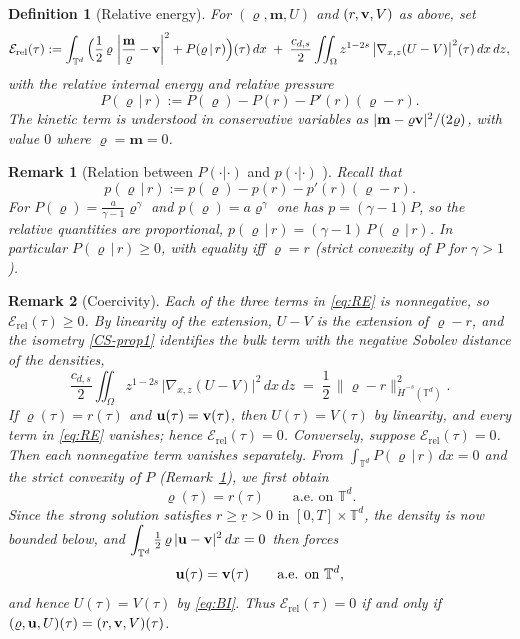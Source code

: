 \documentclass[12pt,a4paper,twoside]{article}
\newcommand{\vr}{\varrho}
\newcommand{\vu}{\vc{u}}
\newcommand{\vv}{\vc{v}}
\newcommand{\vc}[1]{{\bf #1}}
\newcommand{\Erel}{\mathcal{E}_{\mathrm{rel}}}
\newtheorem{df}{Definition}
\newtheorem{rmk}{Remark}
\numberwithin{equation}{section}%
\newcommand{\T}{\mathbb{T}}
\newcommand{\vm}{\vc{m}}
\newcommand{\Gradxz}{\nabla_{x,z}}
\begin{document}
	
	\begin{df}[Relative energy]\label{def:relenergy}
		For $(\vr,\mathbf m, U)$ and $(r,\vv,V)$ as above, set
		\begin{equation}\label{eq:RE}
			\Erel(\tau)
			:= \int_{\mathbb T^d}\Big( \frac12\,\vr\,\left| \frac{\vm}{\vr} - \vv\right|^2 + P(\vr\,|\,r) \Big)(\tau)\,dx
			\;+\; \frac{c_{d,s}}{2}\iint_\Omega z^{1-2s}\,\big|\Gradxz (U-V)\big|^2(\tau)\,dx\,dz,
		\end{equation}
		with the relative internal energy and relative pressure
		\[
		P(\vr\,|\,r) := P(\vr) - P(r) - P'(r)(\vr - r).
		\]
		The kinetic term is understood in conservative variables as $|\mathbf m - \vr\vv|^2/(2\vr)$, with value $0$ where $\vr = \mathbf m = 0$.
	\end{df}
	
\begin{rmk}[Relation between $P(\cdot|\cdot)$ and $p(\cdot| \cdot)$ ]\label{rem:relP} Recall that 
	\[	p(\vr\,|\,r) := p(\vr) - p(r) - p'(r)(\vr - r).\]
	For $P(\vr)=\tfrac{a}{\gamma-1}\vr^\gamma$ and $p(\vr)=a\vr^\gamma$ one has $p=(\gamma-1)P$,
	so the relative quantities are proportional, $p(\vr\,|\,r)=(\gamma-1)\,P(\vr\,|\,r)$. In
	particular $P(\vr\,|\,r)\ge0$, with equality iff $\vr=r$ (strict convexity of $P$ for
	$\gamma>1$).
\end{rmk}

\begin{rmk}[Coercivity]\label{rem:coercivity}
	Each of the three terms in \eqref{eq:RE} is nonnegative, so $\Erel(\tau)\ge0$. By linearity
	of the extension, $U-V$ is the extension of $\vr-r$, and the isometry \eqref{CS-prop1}
	identifies the bulk term with the negative Sobolev distance of the densities,
	\begin{equation}\label{eq:BI}
		\frac{c_{d,s}}{2}\displaystyle\iint_{\Omega} z^{1-2s}\,\big|\Gradxz(U-V)\big|^2\,dx\,dz
		\;=\; \frac12\,\|\vr-r\|_{\dot H^{-s}(\mathbb T^d)}^2 .
	\end{equation}
	If $\vr(\tau)=r(\tau)$ and $\vu(\tau)=\vv(\tau)$, then $U(\tau)=V(\tau)$ by
	linearity, and every term in \eqref{eq:RE} vanishes; hence $\Erel(\tau)=0$.
	Conversely, suppose $\Erel(\tau)=0$. Then each nonnegative term vanishes separately. From
	$\displaystyle\int_{\mathbb T^d} P(\vr\,|\,r)\,dx=0$ and the strict convexity of $P$
	(Remark~\ref{rem:relP}), we first obtain
	\[
	\vr(\tau)=r(\tau)\qquad\text{a.e. on }\mathbb T^d .
	\]
	Since the strong solution satisfies $r \geq \underline{r}>0 \text{ in } [0,T]\times \T^d$, the density is now bounded below, and
	$\displaystyle\int_{\mathbb T^d}\tfrac12\,\vr\,|\vu-\vv|^2\,dx=0$ then forces
	\[
	\vu(\tau)=\vv(\tau)\qquad\text{a.e. on }\mathbb T^d ,
	\]
	and hence $U(\tau)=V(\tau)$ by \eqref{eq:BI}. Thus $\Erel(\tau)=0$ if and only if
	$(\vr,\vu,U)(\tau)=(r,\vv,V)(\tau)$.
\end{rmk}
	
\end{document}

